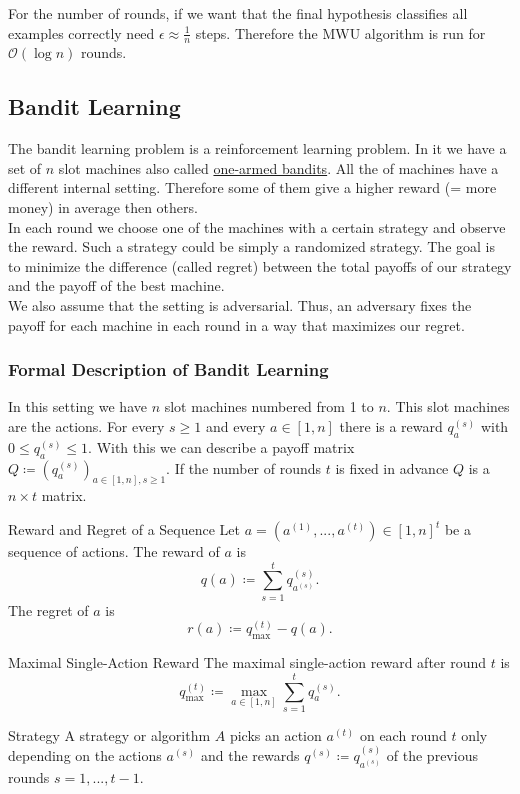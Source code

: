 \documentclass{panikzettel}
\begin{document}
For the number of rounds, if we want that the final hypothesis classifies all examples correctly need $\epsilon\approx\frac{1}{n}$ steps. Therefore the MWU algorithm is run for $\mathcal{O}(\log n)$ rounds.

\subsection{Bandit Learning}
The bandit learning problem is a reinforcement learning problem. In it we have a set of $n$ slot machines also called \href{https://en.wikipedia.org/wiki/Slot_machine}{one-armed bandits}. All the of machines have a different internal setting. Therefore some of them give a higher reward (= more money) in average then others.\\
In each round we choose one of the machines with a certain strategy and observe the reward. Such a strategy could be simply a randomized strategy. The goal is to minimize the difference (called regret) between the total payoffs of our strategy and the payoff of the best machine.\\
We also assume that the setting is adversarial. Thus, an adversary fixes the payoff for each machine in each round in a way that maximizes our regret.

\subsubsection{Formal Description of Bandit Learning}
In this setting we have $n$ slot machines numbered from 1 to $n$. This slot machines are the actions. For every $s\geq 1$ and every $a\in [1,n]$ there is a reward $q_a^{(s)}$ with $0\leq q_a^{(s)} \leq 1$.
With this we can describe a payoff matrix $Q\coloneqq (q_a^{(s)})_{a\in[1,n], s\geq 1}$. If the number of rounds $t$ is fixed in advance $Q$ is a $n\times t$ matrix.

\begin{halfboxl}
\vspace{-\baselineskip}
\begin{defi}{Reward and Regret of a Sequence}
Let $a=(a^{(1)},...,a^{(t)})\in [1,n]^t$ be a sequence of actions. The reward of $a$ is
\[
q(a)\coloneqq \sum_{s=1}^t q_{a^{(s)}}^{(s)}.
\]
The regret of $a$ is
\[
r(a)\coloneqq q_{\max}^{(t)} -q(a).
\]
\end{defi}
\end{halfboxl}
\begin{halfboxr}
\vspace{-\baselineskip}
\begin{defi}{Maximal Single-Action Reward}
The maximal single-action reward after round $t$ is
\[
q_{\max}^{(t)}\coloneqq \max_{a\in[1,n]} \sum_{s=1}^t q_{a}^{(s)}.
\]
\end{defi}
\begin{defi}{Strategy}
A strategy or algorithm $A$ picks an action $a^{(t)}$ on each round $t$ only depending on the actions $a^{(s)}$ and the rewards $q^{(s)}\coloneqq q_{a^{(s)}}^{(s)}$ of the previous rounds $s=1,...,t-1$.
\end{defi}
\end{halfboxr}
\end{document}
